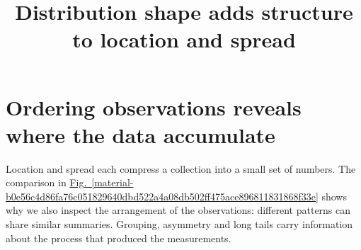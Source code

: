 \documentclass[11pt,a4paper]{article}
\begin{document}
\title{Distribution shape adds structure to location and spread}
\author{}
\date{}
\maketitle
\tableofcontents
\clearpage
\section{Ordering observations reveals where the data accumulate}
Location and spread each compress a collection into a small set of numbers. The comparison in \hyperref[material-b0e56c4d86fa76c051829640dbd522a4a08db502ff475ace896811831868f33e]{Fig.~\ref*{material-b0e56c4d86fa76c051829640dbd522a4a08db502ff475ace896811831868f33e}} shows why we also inspect the arrangement of the observations: different patterns can share similar summaries. Grouping, asymmetry and long tails carry information about the process that produced the measurements.
\end{document}
